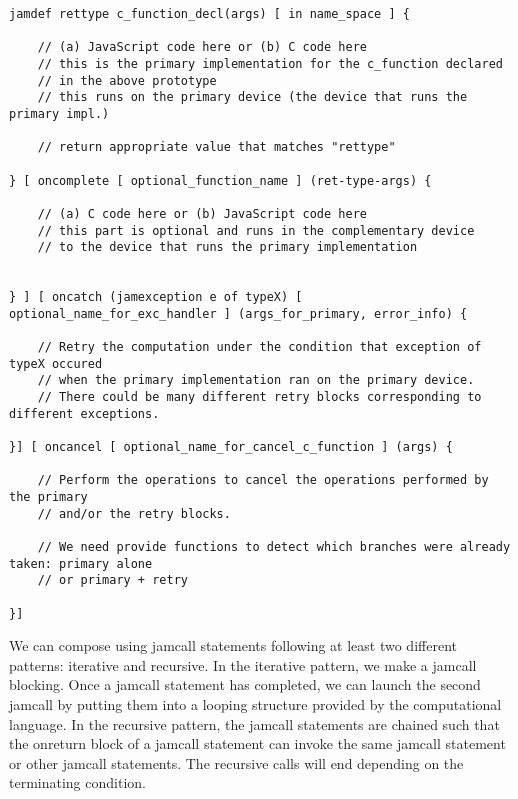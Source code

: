 \documentclass[11pt]{article}
\begin{document}
\medskip

\begin{lstlisting}[caption=Syntax of the activity definition construct, label=activity_def]
jamdef rettype c_function_decl(args) [ in name_space ] {

    // (a) JavaScript code here or (b) C code here
    // this is the primary implementation for the c_function declared
    // in the above prototype
    // this runs on the primary device (the device that runs the primary impl.)

    // return appropriate value that matches "rettype"

} [ oncomplete [ optional_function_name ] (ret-type-args) {

    // (a) C code here or (b) JavaScript code here
    // this part is optional and runs in the complementary device
    // to the device that runs the primary implementation


} ] [ oncatch (jamexception e of typeX) [ optional_name_for_exc_handler ] (args_for_primary, error_info) {

    // Retry the computation under the condition that exception of typeX occured
    // when the primary implementation ran on the primary device.
    // There could be many different retry blocks corresponding to different exceptions.

}] [ oncancel [ optional_name_for_cancel_c_function ] (args) {

    // Perform the operations to cancel the operations performed by the primary
    // and/or the retry blocks.

    // We need provide functions to detect which branches were already taken: primary alone
    // or primary + retry

}]
\end{lstlisting}









We can compose using jamcall statements following at least two different
patterns: iterative and recursive. In the iterative pattern, we make a jamcall
blocking. Once a jamcall statement has completed, we can launch the second
jamcall by putting them into a looping structure provided by the computational
language. In the recursive pattern, the jamcall statements are chained such that
the onreturn block of a jamcall statement can invoke the same jamcall statement
or other jamcall statements. The recursive calls will end depending on the
terminating condition.
\end{document}
